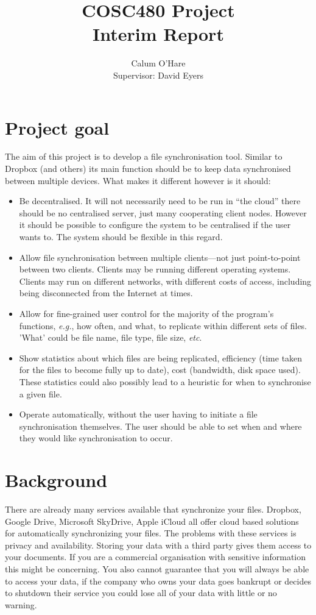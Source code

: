 \documentclass[12pt]{article}
\title{COSC480 Project \\ Interim Report}
\author{Calum O'Hare \\ Supervisor: David Eyers}
\date{}
\begin{document}
\maketitle

\section{Project goal}
The aim of this project is to develop a file synchronisation tool.
Similar to  Dropbox (and others) its main function should be to
keep data synchronised between multiple devices.
What makes it different however is it should:
\begin{itemize}
\item Be decentralised. It will not necessarily need to be run in ``the cloud'' there should be
no centralised server, just many cooperating client nodes. However it should be
possible to configure the system to be centralised if the user wants to. The
system should be flexible in this regard.

\item Allow file synchronisation between multiple clients---not just point-to-point between two clients. Clients may be
running different operating systems. Clients may run on different networks, with different costs of access, including being disconnected from the Internet at times.

\item Allow for fine-grained user control for the majority of the program's
functions, \emph{e.g.}, how often, and what, to replicate within different sets of files. 'What' could be file name, file type, file size, \emph{etc}.

\item Show statistics about which files are being replicated, efficiency (time
taken for the files to become fully up to date),
cost (bandwidth, disk space used). These statistics could also possibly lead
to a heuristic for when to synchronise a given file.

\item Operate automatically, without the user having to initiate a file
synchronisation themselves. The user should be able to set when and
where they would like synchronisation to occur.
\end{itemize}
\section{Background}
There are already many services available
that synchronize your
files. Dropbox, Google Drive, Microsoft SkyDrive, Apple iCloud
all offer cloud based solutions for automatically
synchronizing your files. The problems with these
services is privacy and availability. Storing your data with a
third party gives them access to your documents. If you
are a commercial organisation with sensitive information
this might be concerning. You also cannot guarantee
that you will always be able to access your data, if
the company who owns your data goes bankrupt or
decides to shutdown their service
you could lose all
of your data with little or no warning. 
\end{document}
